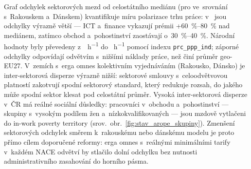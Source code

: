 Graf odchylek sektorových mezd od celostátního mediánu (pro  ve~srovnání s~Rakouskem a~Dánskem) kvantifikuje míru polarizace trhu práce: v~ jsou odchylky výrazně větší --- \acs{ICT} a~finance vykazují prémii +\SIrange{60}{80}{\percent} nad mediánem, zatímco obchod a~pohostinství zaostávají o~\SIrange{30}{40}{\percent}.
Národní hodnoty byly převedeny z~\si{\eur\per\hour} do \si{\pps\per\hour} pomocí indexu \texttt{prc\_ppp\_ind}; záporné odchylky odpovídají odvětvím s~nižšími náklady práce, než činí průměr \acs{geo-EU27}.
V~zemích s~erga omnes kolektivním vyjednáváním (Rakousko, Dánsko) je inter-sektorová disperze výrazně nižší: sektorové smlouvy s~celoodvětvovou platností zakotvují spodní sektorový standard, který redukuje rozsah, do jakého může spodní sektor klesat pod celostátní průměr.
Vysoká inter-sektorová disperze v~ČR má reálné sociální důsledky: pracovníci v~obchodu a~pohostinství --- skupiny s~vysokým podílem žen a~nízkokvalifikovaných --- jsou mzdově vytlačeni do in-work poverty territory (srov.~obr.~\ref{fig:stav_arope_skupiny}).
Zmenšení sektorových odchylek směrem k~rakouskému nebo dánskému modelu je proto přímo cílem doporučené reformy: erga omnes s~reálnými minimálními tarify v~každém \ac{NACE} odvětví by stlačilo dolní odchylku bez nutnosti administrativního zasahování do horního pásma.


